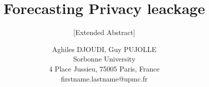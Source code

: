 \documentclass{../../setup/sig-alternate}
\begin{document}
\title{Forecasting Privacy leackage
}

\subtitle{[Extended Abstract]
}

\author{
	Aghiles DJOUDI, Guy PUJOLLE \\ \textsf{Sorbonne University} \\ \textsf{4 Place Jussieu, 75005 Paris, France} \\ \textsf{firstname.lastname@upmc.fr}
}











\printbibliography

\onecolumn


\end{document}

